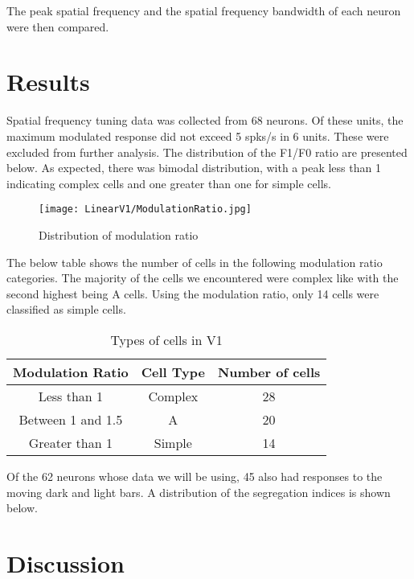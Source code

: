 					The peak spatial frequency and the spatial frequency bandwidth of each neuron were then compared.
					
					

	\section{Results}
	
		Spatial frequency tuning data was collected from 68 neurons. Of these units, the maximum modulated response did not exceed 5 spks/s in 6 units. These were excluded from further analysis. The distribution of the F1/F0 ratio are presented below. As expected, there was bimodal distribution, with a peak less than 1 indicating complex cells and one greater than one for simple cells. 
		
			\begin{figure}
				
				\texttt{[image: LinearV1/ModulationRatio.jpg]}
				\caption{Distribution of modulation ratio}
				\label{fig:fig1}
			\end{figure}
		
		The below table shows the number of cells in the following modulation ratio categories. The majority of the cells we encountered were complex like with the second highest being A cells. Using the modulation ratio, only 14 cells were classified as simple cells.
		
		\begin{table}
			\begin{center}
			\begin{tabular}{ c c c } 
				\hline
				Modulation Ratio & Cell Type & Number of cells \\
				\hline
				Less than 1 & Complex & 28 \\ 
				Between 1 and 1.5 & A & 20 \\ 
				Greater than 1 & Simple & 14 \\ 
				\hline
			\end{tabular}
			\caption{Types of cells in V1}
			\label{table:1}
			\end{center}
		\end{table}
		
		Of the 62 neurons whose data we will be using, 45 also had responses to the moving dark and light bars. A distribution of the segregation indices is shown below.
	\section{Discussion}